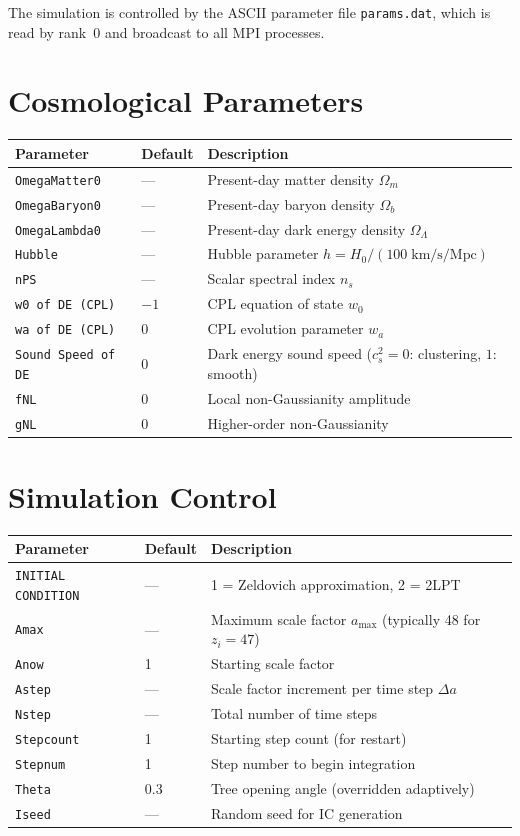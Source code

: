 \documentclass[11pt,fleqn]{book}
\newcommand{\code}[1]{\texttt{#1}}
\newcommand{\file}[1]{\texttt{#1}}
\begin{document}
The simulation is controlled by the ASCII parameter file \file{params.dat}, which is read by rank~0 and broadcast to all MPI processes.

\section{Cosmological Parameters}

\begin{longtable}{L{5cm} C{2cm} L{6.5cm}}
\toprule
\textbf{Parameter} & \textbf{Default} & \textbf{Description} \\
\midrule
\endhead
\code{OmegaMatter0} & --- & Present-day matter density $\Omega_m$ \\
\code{OmegaBaryon0} & --- & Present-day baryon density $\Omega_b$ \\
\code{OmegaLambda0} & --- & Present-day dark energy density $\Omega_\Lambda$ \\
\code{Hubble} & --- & Hubble parameter $h = H_0/(100\;\text{km/s/Mpc})$ \\
\code{nPS} & --- & Scalar spectral index $n_s$ \\
\code{w0 of DE (CPL)} & $-1$ & CPL equation of state $w_0$ \\
\code{wa of DE (CPL)} & $0$ & CPL evolution parameter $w_a$ \\
\code{Sound Speed of DE} & $0$ & Dark energy sound speed ($c_s^2 = 0$: clustering, $1$: smooth) \\
\code{fNL} & $0$ & Local non-Gaussianity amplitude \\
\code{gNL} & $0$ & Higher-order non-Gaussianity \\
\bottomrule
\end{longtable}

\section{Simulation Control}

\begin{longtable}{L{5cm} C{2cm} L{6.5cm}}
\toprule
\textbf{Parameter} & \textbf{Default} & \textbf{Description} \\
\midrule
\endhead
\code{INITIAL CONDITION} & --- & 1 = Zeldovich approximation, 2 = 2LPT \\
\code{Amax} & --- & Maximum scale factor $a_\text{max}$ (typically 48 for $z_i = 47$) \\
\code{Anow} & 1 & Starting scale factor \\
\code{Astep} & --- & Scale factor increment per time step $\Delta a$ \\
\code{Nstep} & --- & Total number of time steps \\
\code{Stepcount} & 1 & Starting step count (for restart) \\
\code{Stepnum} & 1 & Step number to begin integration \\
\code{Theta} & 0.3 & Tree opening angle (overridden adaptively) \\
\code{Iseed} & --- & Random seed for IC generation \\
\bottomrule
\end{longtable}
\end{document}
